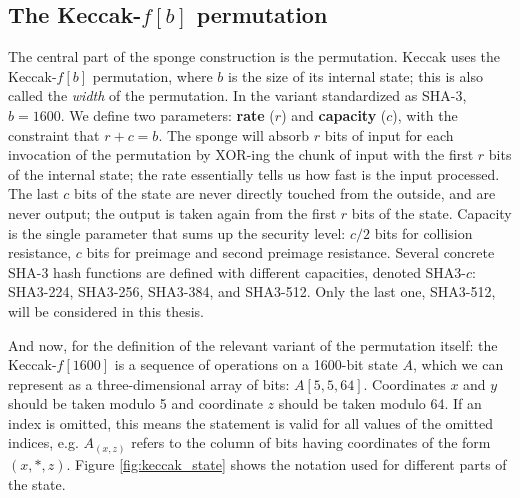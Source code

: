 \documentclass[times, utf8, diplomski]{fer}
\begin{document}
\subsection{The Keccak-$f[b]$ permutation}
The central part of the sponge construction is the permutation.
Keccak uses the Keccak-$f[b]$ permutation, where $b$ is the size of its internal
state; this is also called the \emph{width} of the permutation. In the variant
standardized as SHA-3, $b=1600$.
We define two parameters: \textbf{rate} ($r$) and \textbf{capacity} ($c$),
with the constraint that $r + c = b$. The sponge will absorb $r$ bits of input
for each invocation of the permutation by XOR-ing the chunk of input with the
first $r$ bits of the internal state; the rate essentially tells us how fast
is the input processed. The last $c$ bits of the state are never directly
touched from the outside, and are never output; the output is taken again from
the first $r$ bits of the state. Capacity is the single parameter that sums up
the security level: $c/2$ bits for collision resistance, $c$ bits for preimage
and second preimage resistance. Several concrete SHA-3 hash functions are
defined with different capacities, denoted SHA3-$c$: SHA3-224, SHA3-256,
SHA3-384, and SHA3-512. Only the last one, SHA3-512, will be considered in
this thesis.


And now, for the definition of the relevant variant of the permutation itself:
the Keccak-$f[1600]$ is a sequence of operations on a 1600-bit state $A$, which
we can represent as a three-dimensional array of bits: $A[5,5,64]$. Coordinates
$x$ and $y$ should be taken modulo 5 and coordinate $z$ should be taken modulo 64.
If an index is omitted, this means the statement is valid for all values of the
omitted indices, e.g. $A_{(x,z)}$ refers to the column of bits having coordinates
of the form $(x,\ast,z)$. Figure \ref{fig:keccak_state} shows the notation used
for different parts of the state.
\end{document}
